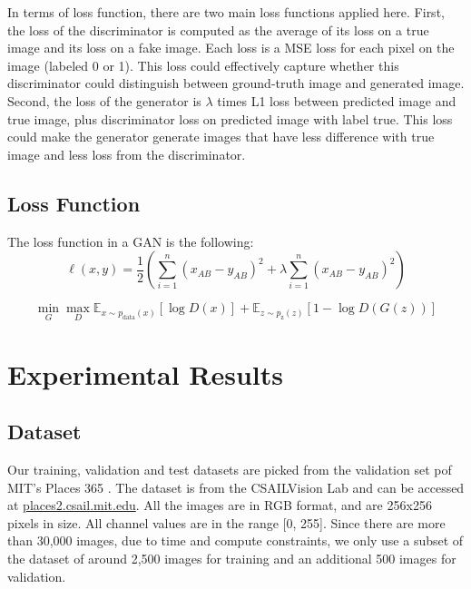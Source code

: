 \documentclass{article}
\begin{document}
In terms of loss function, there are two main loss functions applied here. 
First, the loss of the discriminator is computed as the average of its loss on a true image and its loss on a fake image. 
Each loss is a MSE loss for each pixel on the image (labeled 0 or 1). 
This loss could effectively capture whether this discriminator could distinguish between ground-truth image and generated image.
Second, the loss of the generator is $\lambda$ times L1 loss between predicted image and true image, plus discriminator loss on predicted image with label true.
This loss could make the generator generate images that have less difference with true image and less loss from the discriminator.


\subsection{Loss Function}
The loss function in a GAN is the following:
{\Large
\begin{equation}
    \ell(x,y) = \frac{1}{2} \left( \sum_{i=1}^{n} \left( x_{AB} - y_{AB} \right)^2 + \lambda \sum_{i=1}^{n} \left( x_{AB} - y_{AB} \right)^2 \right)
\end{equation}
}

{\Large
\begin{equation}
\min_{G}\max_{D}\mathbb{E}_{x\sim p_{\text{data}}(x)}[\log{D(x)}] +  \mathbb{E}_{z\sim p_{\text{z}}(z)}[1 - \log{D(G(z))}]
\end{equation}
}



\section{Experimental Results}


\subsection{Dataset}
Our training, validation and test datasets are picked from the validation set pof MIT's Places 365 \cite{7} . The dataset is from the CSAILVision Lab and can be accessed at \url{places2.csail.mit.edu}.
All the images are in RGB format, and are 256x256 pixels in size. All channel values are in the range [0, 255].
Since there are more than 30,000 images, due to time and compute constraints, we only use a subset of the dataset of around 2,500 images for training and an additional 500 images for validation.
\end{document}
